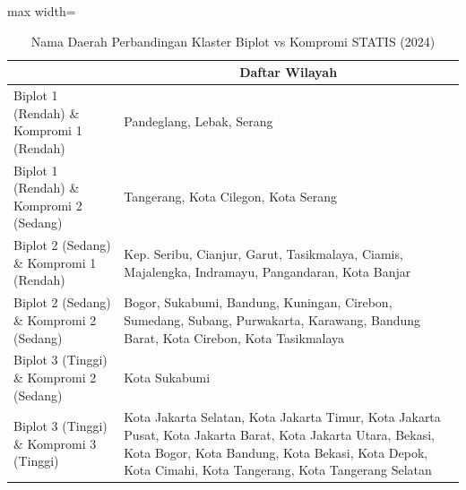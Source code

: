 \begin{table}[H]
\centering
\caption{Nama Daerah Perbandingan Klaster Biplot vs Kompromi STATIS (2024)} \label{tab:app1biplot_comp_name_2024}
\begin{adjustbox}{max width=\textwidth}
\begin{tabular}{|>{\centering\arraybackslash}p{4cm}|p{10cm}|}
\hline
\multicolumn{1}{|c|}{\textbf{Kategori}} & \multicolumn{1}{c|}{\textbf{Daftar Wilayah}} \\
\hline
Biplot 1 (Rendah) \& Kompromi 1 (Rendah) & Pandeglang, Lebak, Serang \\
\hline
Biplot 1 (Rendah) \& Kompromi 2 (Sedang) & Tangerang, Kota Cilegon, Kota Serang \\
\hline
Biplot 2 (Sedang) \& Kompromi 1 (Rendah) & Kep. Seribu, Cianjur, Garut, Tasikmalaya, Ciamis, Majalengka, Indramayu, Pangandaran, Kota Banjar \\
\hline
Biplot 2 (Sedang) \& Kompromi 2 (Sedang) & Bogor, Sukabumi, Bandung, Kuningan, Cirebon, Sumedang, Subang, Purwakarta, Karawang, Bandung Barat, Kota Cirebon, Kota Tasikmalaya \\
\hline
Biplot 3 (Tinggi) \& Kompromi 2 (Sedang) & Kota Sukabumi \\
\hline
Biplot 3 (Tinggi) \& Kompromi 3 (Tinggi) & Kota Jakarta Selatan, Kota Jakarta Timur, Kota Jakarta Pusat, Kota Jakarta Barat, Kota Jakarta Utara, Bekasi, Kota Bogor, Kota Bandung, Kota Bekasi, Kota Depok, Kota Cimahi, Kota Tangerang, Kota Tangerang Selatan \\
\hline
\end{tabular}
\end{adjustbox}
\end{table}